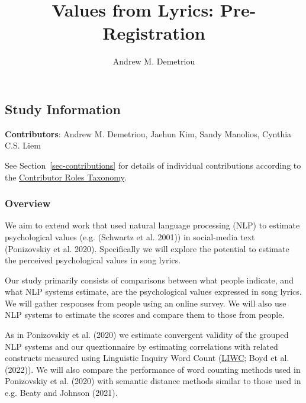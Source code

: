 \documentclass[
  letterpaper,
  DIV=11,
  numbers=noendperiod]{scrartcl}
\title{Values from Lyrics: Pre-Registration}
\author{Andrew M. Demetriou}
\date{}
\begin{document}
\maketitle
\ifdefined\Shaded\renewenvironment{Shaded}{\begin{tcolorbox}[frame hidden, enhanced, borderline west={3pt}{0pt}{shadecolor}, boxrule=0pt, interior hidden, breakable, sharp corners]}{\end{tcolorbox}}\fi

\hypertarget{study-information}{%
\subsection{Study Information}\label{study-information}}

\textbf{Contributors}: Andrew M. Demetriou, Jaehun Kim, Sandy Manolios,
Cynthia C.S. Liem

See Section~\ref{sec-contributions} for details of individual
contributions according to the
\href{https://www.kent.ac.uk/guides/credit-contributor-roles-taxonomy\#:~:text=CRediT\%20(Contributor\%20Roles\%20Taxonomy)\%20is,contribution\%20to\%20the\%20scholarly\%20output.}{Contributor
Roles Taxonomy}.\\

\hypertarget{overview}{%
\subsubsection{Overview}\label{overview}}

We aim to extend work that used natural language processing (NLP) to
estimate psychological values (e.g. (Schwartz et al. 2001)) in
social-media text (Ponizovskiy et al. 2020). Specifically we will
explore the potential to estimate the perceived psychological values in
song lyrics.

Our study primarily consists of comparisons between what people
indicate, and what NLP systems estimate, are the psychological values
expressed in song lyrics. We will gather responses from people using an
online survey. We will also use NLP systems to estimate the scores and
compare them to those from people.

As in Ponizovskiy et al. (2020) we estimate convergent validity of the
grouped NLP systems and our queztionnaire by estimating correlations
with related constructs measured using Linguistic Inquiry Word Count
(\href{https://liwc.app}{LIWC}; Boyd et al. (2022)). We will also
compare the performance of word counting methods used in Ponizovskiy et
al. (2020) with semantic distance methods similar to those used in e.g.
Beaty and Johnson (2021).
\end{document}
